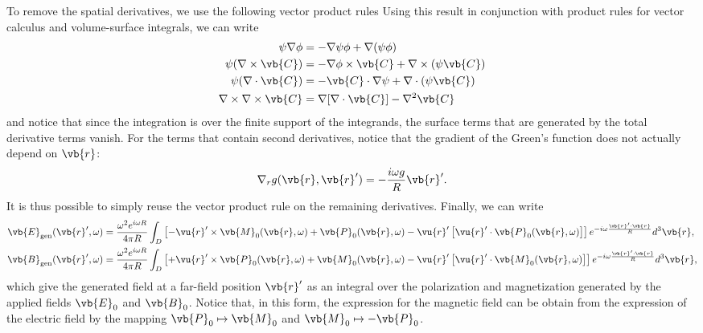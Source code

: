 \documentclass[11pt,SymmetricalJury]{inrsthesis/inrsthesis}
\begin{document}
To remove the spatial derivatives, we use the following vector product
rules
Using this result in conjunction with product rules for vector calculus and volume-surface
integrals, we can write
  \begin{subequations}
  \begin{align}
    \psi\nabla\phi                &= -\nabla\psi\phi + \nabla(\psi\phi) \\
    \psi(\nabla\times\vb{C})      &= -\nabla\phi\times\vb{C} + \nabla\times(\psi\vb{C}) \\
    \psi(\nabla\cdot\vb{C})       &= -\vb{C}\cdot\nabla\psi + \nabla\cdot(\psi\vb{C}) \\
    \nabla\times\nabla\times\vb{C}&= \nabla[\nabla\cdot\vb{C}] - \nabla^2\vb{C}
  \end{align}
  \end{subequations}
and notice that since the integration is over the finite support of the integrands,
the surface terms that are generated by the total derivative terms vanish.
For the terms that contain second derivatives, notice that the gradient of the
Green's function does not actually depend on $\vb{r}$:
\begin{equation}
    \nabla_r g(\vb{r},\vb{r}') = -\frac{i\omega g}{R}\vb{r}'.
  \end{equation}
It is thus possible to simply reuse the vector product rule on the
remaining derivatives.
Finally, we can write
  \begin{subequations}
  \begin{align}
    \vb{E}_\text{gen}(\vb{r}',\omega)
        &= \frac{\omega^2e^{i\omega R}}{4\pi R}\int_D \left[-\vu{r}'\times \vb{M}_0(\vb{r},\omega)+\vb{P}_0(\vb{r},\omega)-\vu{r}'\left[\vu{r}'\cdot\vb{P}_0(\vb{r},\omega)\right]\right]e^{-i\omega \frac{\vb{r}'\cdot\vb{r}}{R}}d^3\vb{r}, \\
    \vb{B}_\text{gen}(\vb{r}',\omega)
        &= \frac{\omega^2e^{i\omega R}}{4\pi R}\int_D \left[+\vu{r}'\times \vb{P}_0(\vb{r},\omega)+\vb{M}_0(\vb{r},\omega)-\vu{r}'\left[\vu{r}'\cdot\vb{M}_0(\vb{r},\omega)\right]\right]e^{-i\omega \frac{\vb{r}'\cdot\vb{r}}{R}}d^3\vb{r},
  \end{align}
  \end{subequations}
which give the generated field at a far-field position $\vb{r}'$ as an integral
over the polarization and magnetization generated by the applied fields $\vb{E}_0$
and $\vb{B}_0$. Notice that, in this form, the expression for the magnetic field
can be obtain from the expression of the electric field by the mapping
$\vb{P}_0\mapsto\vb{M}_0$ and $\vb{M}_0\mapsto-\vb{P}_0$.
\end{document}

